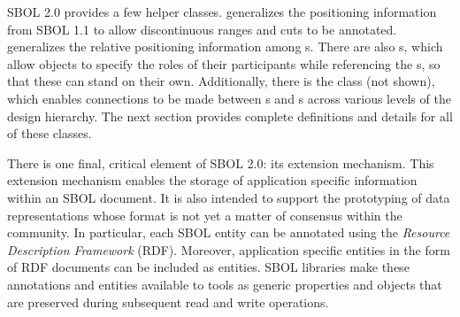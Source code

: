 SBOL 2.0 provides a few helper classes.   generalizes the positioning information from SBOL 1.1 to allow discontinuous ranges and cuts to be annotated.   generalizes the relative positioning information among s.  
There are also s, which allow  objects to specify the roles of their participants while referencing the s, so that these can stand on their own.
Additionally, there is the  class (not shown), which enables connections to be made between s and s across various levels of the design hierarchy.  The next section provides complete definitions and details for all of these classes.

There is one final, critical element of SBOL 2.0: its extension mechanism. This extension mechanism enables the storage of application specific information within an SBOL document. It is also intended to support the prototyping of data representations whose format is not yet a matter of consensus within the community. In particular, each SBOL entity can be annotated using the \emph{Resource Description Framework} (RDF). Moreover, application specific entities in the form of RDF documents can be included as  entities. SBOL libraries make these annotations and entities available to tools as generic properties and objects that are preserved during subsequent read and write operations.